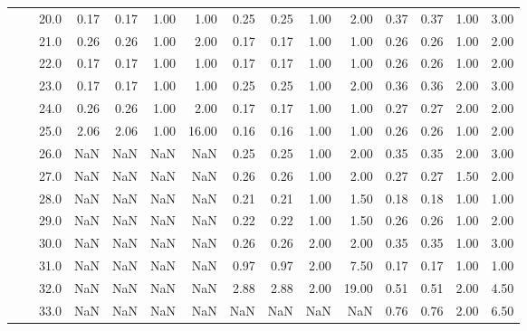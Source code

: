 \begin{tabular}{lllrrrrrrrrrrrr}
       &     & 20.0 &       0.17 &      0.17 & 1.00 &   1.00 &       0.25 &      0.25 &  1.00 &   2.00 &       0.37 &      0.37 &  1.00 &   3.00 \\
       &     & 21.0 &       0.26 &      0.26 & 1.00 &   2.00 &       0.17 &      0.17 &  1.00 &   1.00 &       0.26 &      0.26 &  1.00 &   2.00 \\
       &     & 22.0 &       0.17 &      0.17 & 1.00 &   1.00 &       0.17 &      0.17 &  1.00 &   1.00 &       0.26 &      0.26 &  1.00 &   2.00 \\
       &     & 23.0 &       0.17 &      0.17 & 1.00 &   1.00 &       0.25 &      0.25 &  1.00 &   2.00 &       0.36 &      0.36 &  2.00 &   3.00 \\
       &     & 24.0 &       0.26 &      0.26 & 1.00 &   2.00 &       0.17 &      0.17 &  1.00 &   1.00 &       0.27 &      0.27 &  2.00 &   2.00 \\
       &     & 25.0 &       2.06 &      2.06 & 1.00 &  16.00 &       0.16 &      0.16 &  1.00 &   1.00 &       0.26 &      0.26 &  1.00 &   2.00 \\
       &     & 26.0 &        NaN &       NaN &  NaN &    NaN &       0.25 &      0.25 &  1.00 &   2.00 &       0.35 &      0.35 &  2.00 &   3.00 \\
       &     & 27.0 &        NaN &       NaN &  NaN &    NaN &       0.26 &      0.26 &  1.00 &   2.00 &       0.27 &      0.27 &  1.50 &   2.00 \\
       &     & 28.0 &        NaN &       NaN &  NaN &    NaN &       0.21 &      0.21 &  1.00 &   1.50 &       0.18 &      0.18 &  1.00 &   1.00 \\
       &     & 29.0 &        NaN &       NaN &  NaN &    NaN &       0.22 &      0.22 &  1.00 &   1.50 &       0.26 &      0.26 &  1.00 &   2.00 \\
       &     & 30.0 &        NaN &       NaN &  NaN &    NaN &       0.26 &      0.26 &  2.00 &   2.00 &       0.35 &      0.35 &  1.00 &   3.00 \\
       &     & 31.0 &        NaN &       NaN &  NaN &    NaN &       0.97 &      0.97 &  2.00 &   7.50 &       0.17 &      0.17 &  1.00 &   1.00 \\
       &     & 32.0 &        NaN &       NaN &  NaN &    NaN &       2.88 &      2.88 &  2.00 &  19.00 &       0.51 &      0.51 &  2.00 &   4.50 \\
       &     & 33.0 &        NaN &       NaN &  NaN &    NaN &        NaN &       NaN &   NaN &    NaN &       0.76 &      0.76 &  2.00 &   6.50 \\

\end{tabular}
